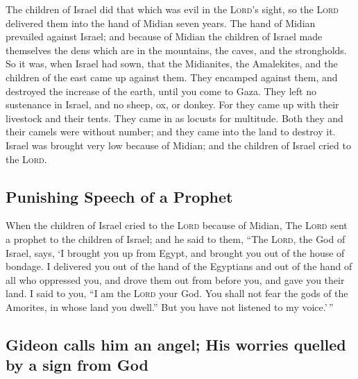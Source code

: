  The children of Israel did that which was evil in the
\textsc{Lord}'s sight, so the \textsc{Lord} delivered them into the hand
of Midian seven years.  The hand of Midian prevailed
against Israel; and because of Midian the children of Israel made
themselves the dens which are in the mountains, the caves, and the
strongholds.  So it was, when Israel had sown, that the
Midianites, the Amalekites, and the children of the east came up against
them.  They encamped against them, and destroyed the
increase of the earth, until you come to Gaza. They left no sustenance
in Israel, and no sheep, ox, or donkey.  For they came up
with their livestock and their tents. They came in as locusts for
multitude. Both they and their camels were without number; and they came
into the land to destroy it.  Israel was brought very low
because of Midian; and the children of Israel cried to the
\textsc{Lord}.

\hypertarget{punishing-speech-of-a-prophet}{%
\subsection{Punishing Speech of a
Prophet}\label{punishing-speech-of-a-prophet}}

 When the children of Israel cried to the \textsc{Lord}
because of Midian,  The \textsc{Lord} sent a prophet to
the children of Israel; and he said to them, ``The \textsc{Lord}, the
God of Israel, says, `I brought you up from Egypt, and brought you out
of the house of bondage.  I delivered you out of the hand
of the Egyptians and out of the hand of all who oppressed you, and drove
them out from before you, and gave you their land.  I
said to you, ``I am the \textsc{Lord} your God. You shall not fear the
gods of the Amorites, in whose land you dwell.'' But you have not
listened to my voice.'\,''

\hypertarget{gideon-calls-him-an-angel-his-worries-quelled-by-a-sign-from-god}{%
\subsection{Gideon calls him an angel; His worries quelled by a sign
from
God}\label{gideon-calls-him-an-angel-his-worries-quelled-by-a-sign-from-god}}

